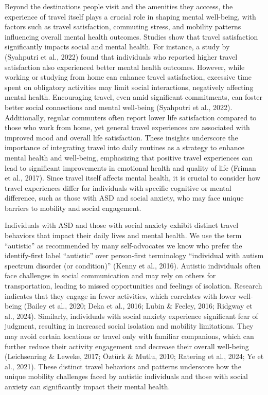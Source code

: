 \documentclass[
  letterpaper,
  number,
  review,
  3p]{elsarticle}
\begin{document}
Beyond the destinations people visit and the amenities they acccess, the
experience of travel itself plays a crucial role in shaping mental
well-being, with factors such as travel satisfaction, commuting stress,
and mobility patterns influencing overall mental health outcomes.
Studies show that travel satisfaction significantly impacts social and
mental health. For instance, a study by (Syahputri et al., 2022) found
that individuals who reported higher travel satisfaction also
experienced better mental health outcomes. However, while working or
studying from home can enhance travel satisfaction, excessive time spent
on obligatory activities may limit social interactions, negatively
affecting mental health. Encouraging travel, even amid significant
commitments, can foster better social connections and mental well-being
(Syahputri et al., 2022). Additionally, regular commuters often report
lower life satisfaction compared to those who work from home, yet
general travel experiences are associated with improved mood and overall
life satisfaction. These insights underscore the importance of
integrating travel into daily routines as a strategy to enhance mental
health and well-being, emphasizing that positive travel experiences can
lead to significant improvements in emotional health and quality of life
(Friman et al., 2017). Since travel itself affects mental health, it is
crucial to consider how travel experiences differ for individuals with
specific cognitive or mental difference, such as those with ASD and
social anxiety, who may face unique barriers to mobility and social
engagement.

Individuals with ASD and those with social anxiety exhibit distinct
travel behaviors that impact their daily lives and mental health. We use
the term ``autistic'' as recommended by many self-advocates we know who
prefer the identify-first label ``autistic'' over person-first
terminology ``individual with autism spectrum disorder (or condition)''
(Kenny et al., 2016). Autistic individuals often face challenges in
social communication and may rely on others for transportation, leading
to missed opportunities and feelings of isolation. Research indicates
that they engage in fewer activities, which correlates with lower
well-being (Bailey et al., 2020; Deka et al., 2016; Lubin \& Feeley,
2016; Ridgway et al., 2024). Similarly, individuals with social anxiety
experience significant fear of judgment, resulting in increased social
isolation and mobility limitations. They may avoid certain locations or
travel only with familiar companions, which can further reduce their
activity engagement and decrease their overall well-being (Leichsenring
\& Leweke, 2017; Öztürk \& Mutlu, 2010; Ratering et al., 2024; Ye et
al., 2021). These distinct travel behaviors and patterns underscore how
the unique mobility challenges faced by autistic individuals and those
with social anxiety can significantly impact their mental health.
\end{document}
